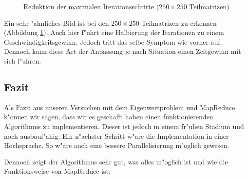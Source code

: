 \begin{refsection}
\begin{figure}
\begin{center}
\end{center}
\caption{Reduktion der maximalen Iterationsschritte ($250\times250$ Teilmatrizen)}
\label{ww}
\end{figure}
Ein sehr "ahnliches Bild ist bei den $250\times250$ Teilmatrizen zu erkennen (Abbildung \ref{ww}). Auch hier f"uhrt eine Halbierung der Iterationen zu einem Geschwindigkeitsgewinn. Jedoch tritt das selbe Symptom wie vorher auf. Dennoch kann diese Art der Anpassung je nach Situation einen Zeitgewinn mit sich f"uhren.
\subsection{Fazit}
Als Fazit aus unseren Versuchen mit dem Eigenwertproblem und MapReduce k"onnen wir sagen, dass wir es geschafft haben einen funktionierenden Algorithmus zu implementieren. Dieser ist jedoch in einem fr"uhen Stadium und noch ausbauf"ahig. Ein n"achster Schritt w"are die Implementation in einer Hochsprache. So w"are auch eine bessere Parallelisierung m"oglich gewesen.

Dennoch zeigt der Algorithmus sehr gut, was alles m"oglich ist und wie die Funktionsweise von MapReduce ist.

\printbibliography[heading=subbibliography]
\end{refsection}

